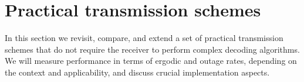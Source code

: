 \documentclass[10pt,journal,a4paper]{IEEEtran}
\renewcommand{\P}{\mathsf{Pr}} 			%
\begin{document}
%
%

\section{Practical transmission schemes}
\label{sec:schemes}
In this section we revisit, compare, and extend a set of practical transmission schemes that do not require the receiver to perform complex decoding algorithms. We will measure performance in terms of ergodic and outage rates, depending on the context and applicability, and discuss crucial implementation aspects. 
\end{document}
